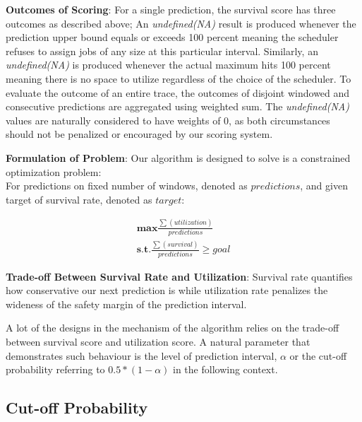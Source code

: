 \documentclass{article}
\begin{document}
\begin{flushleft}
\textbf{Outcomes of Scoring}: For a single prediction, the survival score has three outcomes as described above; An \textit{undefined(NA)} result is produced whenever the prediction upper bound equals or exceeds 100 percent meaning the scheduler refuses to assign jobs of any size at this particular interval. Similarly, an \textit{undefined(NA)} is produced whenever the actual maximum hits 100 percent meaning there is no space to utilize regardless of the choice of the scheduler. To evaluate the outcome of an entire trace, the outcomes of disjoint windowed and consecutive predictions are aggregated using weighted sum. The \textit{undefined(NA)} values are naturally considered to have weights of 0, as both circumstances should not be penalized or encouraged by our scoring system.
\end{flushleft}

\begin{flushleft}
\textbf{Formulation of Problem}: Our algorithm is designed to solve is a constrained optimization problem: \\
For predictions on fixed number of windows, denoted as $predictions$, and given target of survival rate, denoted as $target$:

\begin{equation*}\label{eq:pareto mle2}
  \begin{multlined}
    \mathbf{max}  \frac{\sum(utilization)}{predictions} \\
    \mathbf{s.t.} \frac{\sum(survival)}{predictions} \geq goal
 \end{multlined}
\end{equation*}
\end{flushleft}

\begin{flushleft}
\textbf{Trade-off Between Survival Rate and Utilization}:
Survival rate quantifies how conservative our next prediction is while utilization rate penalizes the wideness of the safety margin of the prediction interval.

A lot of the designs in the mechanism of the algorithm relies on the trade-off between survival score and utilization score. A natural parameter that demonstrates such behaviour is the level of prediction interval, $\alpha$ or the cut-off probability referring to $0.5 * (1 - \alpha)$ in the following context.
\end{flushleft}

\subsection{Cut-off Probability}
\end{document}
